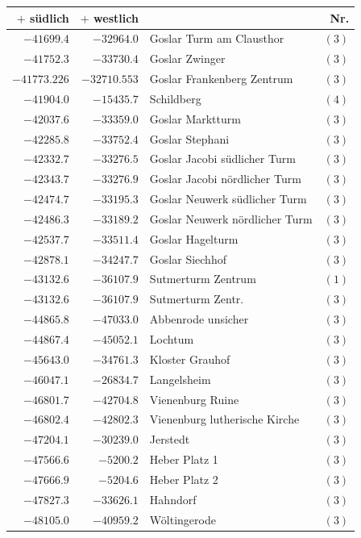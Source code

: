 \clearpage{}%
\begin{center}\begingroup\fontsize{8}{9}\selectfont
\setlength{\tabcolsep}{4pt}
\begin{tabular}{r|r|p{170pt}|r}\hline
\(+\) südlich&\(+\) westlich&&Nr.\\\hline
\(-41699.4\)&\(-32964.0\)&Goslar Turm am Clausthor&\((3)\)\\
\(-41752.3\)&\(-33730.4\)&Goslar Zwinger&\((3)\)\\
\(-41773.226\)&\(-32710.553\)&Goslar Frankenberg Zentrum&\((3)\)\\
\(-41904.0\)&\(-15435.7\)&Schildberg&\((4)\)\\
\(-42037.6\)&\(-33359.0\)&Goslar Marktturm&\((3)\)\\
\(-42285.8\)&\(-33752.4\)&Goslar Stephani&\((3)\)\\
\(-42332.7\)&\(-33276.5\)&Goslar Jacobi südlicher Turm&\((3)\)\\
\(-42343.7\)&\(-33276.9\)&Goslar Jacobi nördlicher Turm&\((3)\)\\
\(-42474.7\)&\(-33195.3\)&Goslar Neuwerk südlicher Turm&\((3)\)\\
\(-42486.3\)&\(-33189.2\)&Goslar Neuwerk nördlicher Turm&\((3)\)\\
\(-42537.7\)&\(-33511.4\)&Goslar Hagelturm&\((3)\)\\
\(-42878.1\)&\(-34247.7\)&Goslar Siechhof&\((3)\)\\
\(-43132.6\)&\(-36107.9\)&Sutmerturm Zentrum&\((1)\)\\
\(-43132.6\)&\(-36107.9\)&Sutmerturm Zentr.&\((3)\)\\
\(-44865.8\)&\(-47033.0\)&Abbenrode unsicher&\((3)\)\\
\(-44867.4\)&\(-45052.1\)&Lochtum&\((3)\)\\
\(-45643.0\)&\(-34761.3\)&Kloster Grauhof&\((3)\)\\
\(-46047.1\)&\(-26834.7\)&Langelsheim&\((3)\)\\
\(-46801.7\)&\(-42704.8\)&Vienenburg Ruine&\((3)\)\\
\(-46802.4\)&\(-42802.3\)&Vienenburg lutherische Kirche&\((3)\)\\
\(-47204.1\)&\(-30239.0\)&Jerstedt&\((3)\)\\
\(-47566.6\)&\(-5200.2\)&Heber Platz 1&\((3)\)\\
\(-47666.9\)&\(-5204.6\)&Heber Platz 2&\((3)\)\\
\(-47827.3\)&\(-33626.1\)&Hahndorf&\((3)\)\\
\(-48105.0\)&\(-40959.2\)&Wöltingerode&\((3)\)\\

\end{tabular}
\end{center}
